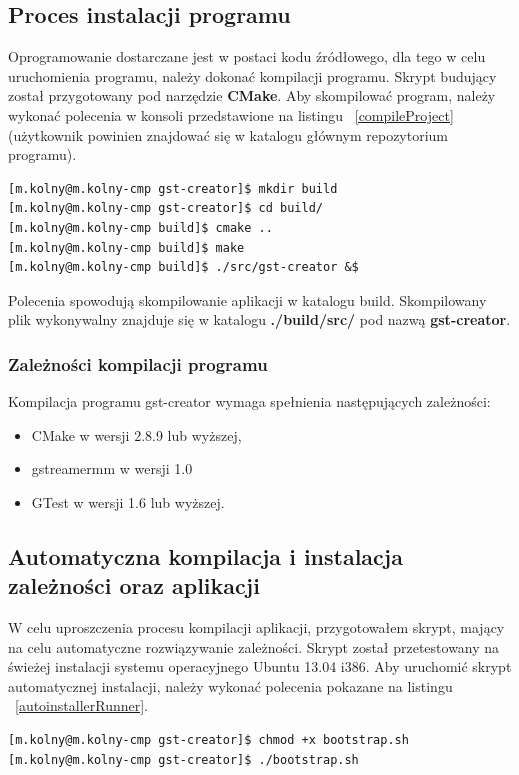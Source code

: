 \documentclass[12pt]{article}
\begin{document}
\subsection{Proces instalacji programu}
Oprogramowanie dostarczane jest w postaci kodu źródłowego, dla tego w celu uruchomienia programu, należy dokonać kompilacji programu. Skrypt budujący został przygotowany pod narzędzie \textbf{CMake}. Aby skompilować program, należy wykonać polecenia w konsoli przedstawione na listingu ~\ref{compileProject} (użytkownik powinien znajdować się w katalogu głównym repozytorium programu).
\begin{lstlisting}[caption=Polecenia kompilujące program gst-creator, label=compileProject]
[m.kolny@m.kolny-cmp gst-creator]$ mkdir build
[m.kolny@m.kolny-cmp gst-creator]$ cd build/
[m.kolny@m.kolny-cmp build]$ cmake ..
[m.kolny@m.kolny-cmp build]$ make
[m.kolny@m.kolny-cmp build]$ ./src/gst-creator &$
\end{lstlisting}
Polecenia spowodują skompilowanie aplikacji w katalogu build. Skompilowany plik wykonywalny znajduje się w katalogu \textbf{./build/src/} pod nazwą \textbf{gst-creator}. 
\subsubsection{Zależności kompilacji programu}
Kompilacja programu gst-creator wymaga spełnienia następujących zależności:
\begin{itemize}
  \setlength{\itemsep}{0em}
\item CMake w wersji 2.8.9 lub wyższej,
\item gstreamermm w wersji 1.0
\item GTest w wersji 1.6 lub wyższej.
\end{itemize}
\subsection{Automatyczna kompilacja i instalacja zależności oraz aplikacji}
W celu uproszczenia procesu kompilacji aplikacji, przygotowałem skrypt, mający na celu automatyczne rozwiązywanie zależności. Skrypt został przetestowany na świeżej instalacji systemu operacyjnego Ubuntu 13.04 i386. Aby uruchomić skrypt automatycznej instalacji, należy wykonać polecenia pokazane na listingu ~\ref{autoinstallerRunner}.
\begin{lstlisting}[caption=Uruchomienie skryptu autoinstalatora, label=autoinstallerRunner]
[m.kolny@m.kolny-cmp gst-creator]$ chmod +x bootstrap.sh
[m.kolny@m.kolny-cmp gst-creator]$ ./bootstrap.sh
\end{lstlisting}
\end{document}
